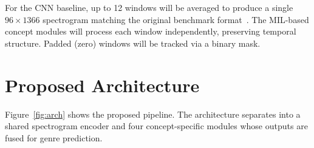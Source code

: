 \documentclass[sigconf,nonacm]{acmart}
\begin{document}
For the CNN baseline, up to 12 windows will be averaged to produce a single $96\times1366$
spectrogram matching the original benchmark format~\cite{hershey2017cnn}. The MIL-based concept
modules will process each window independently, preserving temporal structure. Padded (zero)
windows will be tracked via a binary mask.

\section{Proposed Architecture}

Figure~\ref{fig:arch} shows the proposed pipeline. The architecture separates into a shared
spectrogram encoder and four concept-specific modules whose outputs are fused for genre
prediction.
\end{document}

